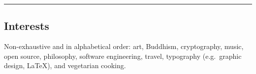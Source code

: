 \documentclass[10pt,a4paper]{article}
\begin{document}
\hrule \vspace{-0.4em} \subsection*{Interests}

  \begin{indentsection}{\parindent}
  \begin{description*}
    \item[Non-exhaustive and in alphabetical order:]
    art, Buddhism, cryptography, music, open source, philosophy, software engineering, travel, typography (e.g.\ graphic design, \LaTeX),  and vegetarian cooking.
  \end{description*}
  \end{indentsection}
\end{document}
